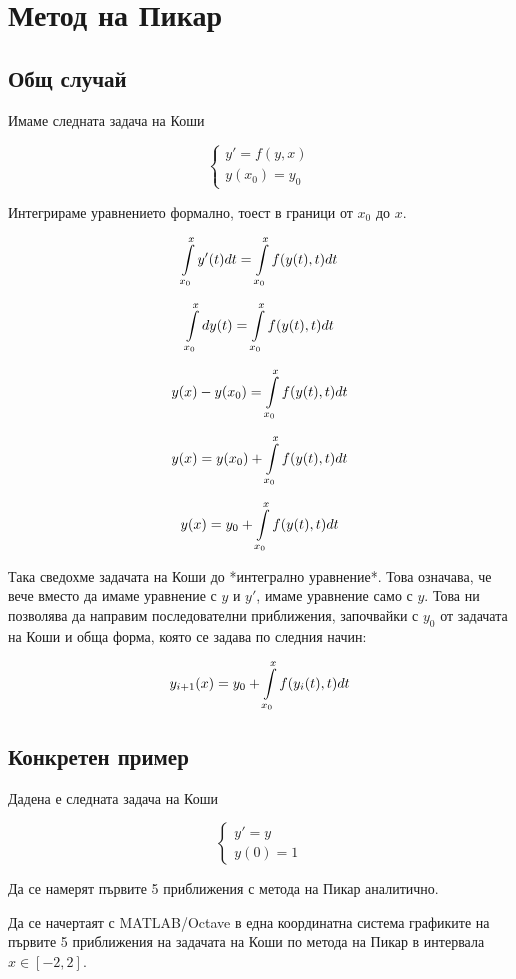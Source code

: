 \documentclass{scrartcl}
\begin{document}
\section{Метод на Пикар}

\subsection{Общ случай}

Имаме следната задача на Коши

$$
\begin{cases}
y'=f(y, x)\\
y(x_0) = y_0
\end{cases}
$$

Интегрираме уравнението формално, тоест в граници от $x_0$ до $x$.

$$\displaystyle \int \limits_{x_0}^{x} y'(t) \space dt = \int \limits_{x_0}^{x} f(y(t), t) \space dt$$

$$\displaystyle \int \limits_{x_0}^{x} \space dy(t) = \int \limits_{x_0}^{x} f(y(t), t) \space dt$$

$$\displaystyle y(x) - y(x_0) = \int \limits_{x_0}^{x} f(y(t), t) \space dt$$

$$\displaystyle y(x) = y(x_0) + \int \limits_{x_0}^{x} f(y(t), t) \space dt$$

$$\displaystyle y(x) = y_0 + \int \limits_{x_0}^{x} f(y(t), t) \space dt$$

Така сведохме задачата на Коши до *интегрално уравнение*. Това означава, че вече вместо да имаме уравнение с $y$ и $y'$, имаме уравнение само с $y$. Това ни позволява да направим последователни приближения, започвайки с $y_0$ от задачата на Коши и обща форма, която се задава по следния начин:

$$\displaystyle y_{i+1}(x) = y_0 + \int \limits_{x_0}^{x} f(y_{i}(t), t) \space dt$$

\subsection{Конкретен пример}

Дадена е следната задача на Коши

$$
\begin{cases}
y'=y\\
y(0) = 1
\end{cases}
$$

Да се намерят първите 5 приближения с метода на Пикар аналитично.

Да се начертаят с MATLAB/Octave в една координатна система графиките на първите 5 приближения на задачата на Коши по метода на Пикар в интервала $x\in[-2, 2]$.
\end{document}
